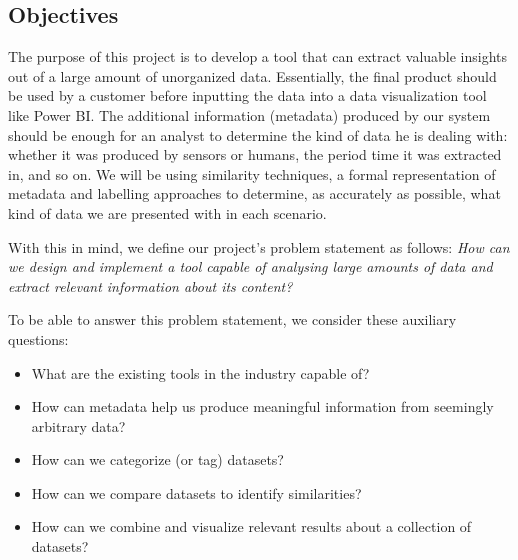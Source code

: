 \subsection{Objectives}
The purpose of this project is to develop a tool that can extract valuable insights out of a large amount of unorganized data.
Essentially, the final product should be used by a customer before inputting the data into a data visualization tool like Power BI.
The additional information (metadata) produced by our system should be enough for an analyst to determine the kind of data
he is dealing with: whether it was produced by sensors or humans, the period time it was extracted in, and so on.
We will be using similarity techniques, a formal representation of metadata and labelling approaches to determine, as
accurately as possible, what kind of data we are presented with in each scenario.

\bigbreak

With this in mind, we define our project's problem statement as follows:
\textit{How can we design and implement a tool capable of analysing large amounts of data and extract relevant
information about its content?}

To be able to answer this problem statement, we consider these auxiliary questions:
\begin{itemize}
    \item What are the existing tools in the industry capable of?
    \item How can metadata help us produce meaningful information from seemingly arbitrary data?
    \item How can we categorize (or tag) datasets?
    \item How can we compare datasets to identify similarities?
    \item How can we combine and visualize relevant results about a collection of datasets?
\end{itemize}
